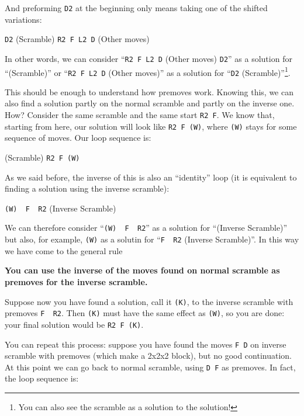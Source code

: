 \documentclass[11pt,a4paper]{book}
\newcommand{\p}{\textquotesingle}
\newcommand{\m}{\texttt}
\newcommand{\ps}{\p\,\,}
\begin{document}
And preforming \m{D2} at the beginning only means taking one of the shifted variations:

\begin{center}
\m{D2} (Scramble) \m{R2 F L2 D\p} (Other moves)
\end{center}

In other words, we can consider ``\m{R2 F L2 D\p} (Other moves) \m{D2}'' as a solution for ``(Scramble)'' or ``\m{R2 F L2 D\p} (Other moves)'' as a solution for ``\m{D2} (Scramble)''\footnote{You can also see the scramble as a solution to the solution!}.

This should be enough to understand how premoves work. Knowing this, we can also find a solution partly on the normal scramble and partly on the inverse one. How? Consider the same scramble and the same start \m{R2 F}. We know that, starting from here, our solution will look like \m{R2 F (W)}, where \m{(W)} stays for some sequence of moves. Our loop sequence is:

\begin{center}
(Scramble) \m{R2 F (W)}
\end{center}

As we said before, the inverse of this is also an ``identity'' loop (it is equivalent to finding a solution using the inverse scramble):

\begin{center}
\m{(W)\ps F\ps R2} (Inverse Scramble)
\end{center}

We can therefore consider ``\m{(W)\ps F\ps R2}'' as a solution for ``(Inverse Scramble)'' but also, for example, \m{(W)\p} as a solutin for ``\m{F\ps R2} (Inverse Scramble)''. In this way we have come to the general rule

\begin{framed}
\textbf{You can use the inverse of the moves found on normal scramble as premoves for the inverse scramble.}
\end{framed}

Suppose now you have found a solution, call it \m{(K)}, to the inverse scramble with premoves \m{F\ps R2}. Then \m{(K)} must have the same effect as \m{(W)\p}, so you are done: your final solution would be \m{R2 F (K)\p}.

You can repeat this process: suppose you have found the moves \m{F D\p} on inverse scramble with premoves (which make a 2x2x2 block), but no good continuation. At this point we can go back to normal scramble, using \m{D F\p} as premoves. In fact, the loop sequence is:
\end{document}
